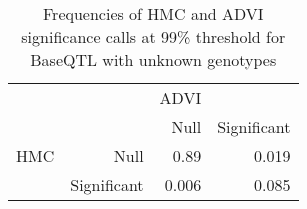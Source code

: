 \begin{table}[ht]
\centering
\caption{Frequencies of HMC and ADVI significance calls at 99\% threshold for BaseQTL with unknown genotypes} 
\label{tab:noGT-xtab-prop-99}
\begin{tabular}{rr|rr}
   &  & ADVI &  \\ 
    &   & Null & Significant \\ 
   \hline
HMC & Null & 0.89 & 0.019 \\ 
    & Significant & 0.006 & 0.085 \\ 
  \end{tabular}
\end{table}
